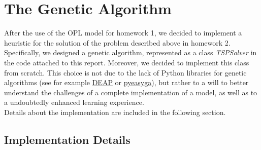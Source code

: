 \documentclass{article}
\begin{document}
\section{The Genetic Algorithm}\label{sec:algorithm}
After the use of the OPL model for homework 1, we decided to implement a heuristic for the solution of the problem described above in homework 2. Specifically, we designed a genetic algorithm, represented as a class \textit{TSPSolver} in the code attached to this report. Moreover, we decided to implement this class from scratch. This choice is not due to the lack of Python libraries for genetic algorithms (see for example \href{https://deap.readthedocs.io/en/master/}{DEAP} or  \href{https://pyeasyga.readthedocs.io/en/latest/index.html}{pyeasyga}), but rather to a will to better understand the challenges of a complete implementation of a model, as well as to a undoubtedly enhanced learning experience. \\
Details about the implementation are included in the following section.

\subsection{Implementation Details}
\end{document}
